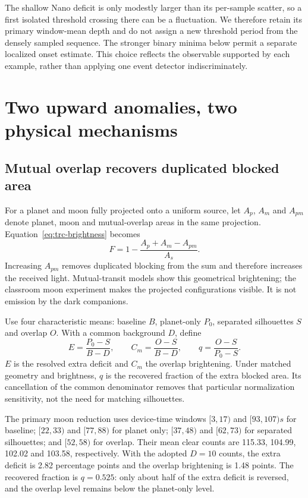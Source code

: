 The shallow Nano deficit is only modestly larger than its per-sample scatter, so a first isolated threshold crossing there can be a fluctuation. We therefore retain its primary window-mean depth and do not assign a new threshold period from the densely sampled sequence. The stronger binary minima below permit a separate localized onset estimate. This choice reflects the observable supported by each example, rather than applying one event detector indiscriminately.

\section{Two upward anomalies, two physical mechanisms}
\subsection{Mutual overlap recovers duplicated blocked area}
For a planet and moon fully projected onto a uniform source, let $A_p$, $A_m$ and $A_{pm}$ denote planet, moon and mutual-overlap areas in the same projection. Equation~\ref{eq:trc-brightness} becomes
\begin{equation}
F=1-\frac{A_p+A_m-A_{pm}}{A_s}.
\label{eq:trc-moon}
\end{equation}
Increasing $A_{pm}$ removes duplicated blocking from the sum and therefore increases the received light. Mutual-transit models\cite{sato2009} show this geometrical brightening; the classroom moon experiment\cite{exomoonlesson2023} makes the projected configurations visible. It is not emission by the dark companions.

Use four characteristic means: baseline $B$, planet-only $P_0$, separated silhouettes $S$ and overlap $O$. With a common background $D$, define
\begin{equation}
E=\frac{P_0-S}{B-D},\qquad
C_m=\frac{O-S}{B-D},\qquad
q=\frac{O-S}{P_0-S}.
\label{eq:trc-moon-contrast}
\end{equation}
$E$ is the resolved extra deficit and $C_m$ the overlap brightening. Under matched geometry and brightness, $q$ is the recovered fraction of the extra blocked area. Its cancellation of the common denominator removes that particular normalization sensitivity, not the need for matching silhouettes.

The primary moon reduction uses device-time windows $[3,17)$ and $[93,107)\unit{s}$ for baseline; $[22,33)$ and $[77,88)$ for planet only; $[37,48)$ and $[62,73)$ for separated silhouettes; and $[52,58)$ for overlap. Their mean clear counts are 115.33, 104.99, 102.02 and 103.58, respectively. With the adopted $D=10$ counts, the extra deficit is 2.82 percentage points and the overlap brightening is 1.48 points. The recovered fraction is $q=0.525$: only about half of the extra deficit is reversed, and the overlap level remains below the planet-only level.

